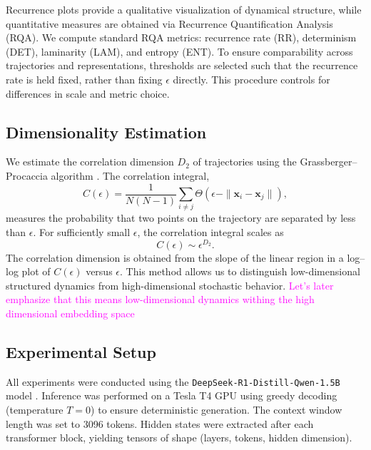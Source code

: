 \documentclass[aip%
 aip,
 amsmath,amssymb,
 reprint,%
]{revtex4-1}
\newcommand{\mage}[1]{\textcolor{magenta}{#1}}
\begin{document}
Recurrence plots provide a qualitative visualization of dynamical structure, while quantitative measures are obtained via Recurrence Quantification Analysis (RQA). We compute standard RQA metrics: recurrence rate (RR), determinism (DET), laminarity (LAM), and entropy (ENT). To ensure comparability across trajectories and representations, thresholds are selected such that the recurrence rate is held fixed, rather than fixing $\epsilon$ directly. This procedure controls for differences in scale and metric choice.

\subsection{Dimensionality Estimation}
\label{subsec:dimensionality_methods}

We estimate the correlation dimension $D_2$ of trajectories using the Grassberger--Procaccia algorithm \cite{GRASSBERGER1983189}. The correlation integral,
\begin{equation}
C(\epsilon)
=
\frac{1}{N(N-1)}
\sum_{i\neq j}
\Theta\!\left(\epsilon-\|\mathbf{x}_i-\mathbf{x}_j\|\right),
\end{equation}
measures the probability that two points on the trajectory are separated by less than $\epsilon$. For sufficiently small $\epsilon$, the correlation integral scales as
\begin{equation}
C(\epsilon) \sim \epsilon^{D_2}.
\end{equation}
The correlation dimension is obtained from the slope of the linear region in a log--log plot of $C(\epsilon)$ versus $\epsilon$. This method allows us to distinguish low-dimensional structured dynamics from high-dimensional stochastic behavior.
\mage{Let's later emphasize that this means low-dimensional dynamics withing the high dimensional embedding space}

\subsection{Experimental Setup}
\label{subsec:experiments}

All experiments were conducted using the \texttt{DeepSeek-R1-Distill-Qwen-1.5B} model \cite{deepseek2025r1distillqwen1.5b}. Inference was performed on a Tesla T4 GPU using greedy decoding (temperature $T=0$) to ensure deterministic generation. The context window length was set to 3096 tokens. Hidden states were extracted after each transformer block, yielding tensors of shape (layers, tokens, hidden dimension).
\end{document}
